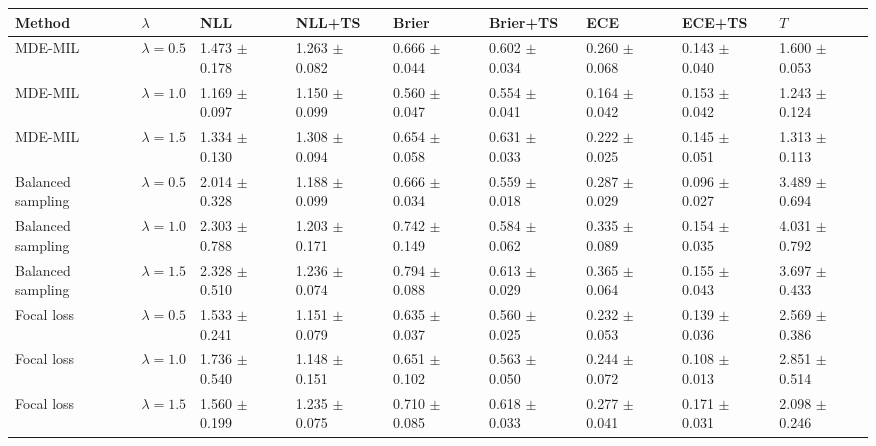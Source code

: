 \begin{tabular}{lllllllll}
\toprule
Method & $\lambda$ & NLL & NLL+TS & Brier & Brier+TS & ECE & ECE+TS & $T$\\
\midrule
MDE-MIL & $\lambda=0.5$ & \num{1.473} $\pm$ \num{0.178} & \num{1.263} $\pm$ \num{0.082} & \num{0.666} $\pm$ \num{0.044} & \num{0.602} $\pm$ \num{0.034} & \num{0.260} $\pm$ \num{0.068} & \num{0.143} $\pm$ \num{0.040} & \num{1.600} $\pm$ \num{0.053}\\
MDE-MIL & $\lambda=1.0$ & \num{1.169} $\pm$ \num{0.097} & \num{1.150} $\pm$ \num{0.099} & \num{0.560} $\pm$ \num{0.047} & \num{0.554} $\pm$ \num{0.041} & \num{0.164} $\pm$ \num{0.042} & \num{0.153} $\pm$ \num{0.042} & \num{1.243} $\pm$ \num{0.124}\\
MDE-MIL & $\lambda=1.5$ & \num{1.334} $\pm$ \num{0.130} & \num{1.308} $\pm$ \num{0.094} & \num{0.654} $\pm$ \num{0.058} & \num{0.631} $\pm$ \num{0.033} & \num{0.222} $\pm$ \num{0.025} & \num{0.145} $\pm$ \num{0.051} & \num{1.313} $\pm$ \num{0.113}\\
Balanced sampling & $\lambda=0.5$ & \num{2.014} $\pm$ \num{0.328} & \num{1.188} $\pm$ \num{0.099} & \num{0.666} $\pm$ \num{0.034} & \num{0.559} $\pm$ \num{0.018} & \num{0.287} $\pm$ \num{0.029} & \num{0.096} $\pm$ \num{0.027} & \num{3.489} $\pm$ \num{0.694}\\
Balanced sampling & $\lambda=1.0$ & \num{2.303} $\pm$ \num{0.788} & \num{1.203} $\pm$ \num{0.171} & \num{0.742} $\pm$ \num{0.149} & \num{0.584} $\pm$ \num{0.062} & \num{0.335} $\pm$ \num{0.089} & \num{0.154} $\pm$ \num{0.035} & \num{4.031} $\pm$ \num{0.792}\\
Balanced sampling & $\lambda=1.5$ & \num{2.328} $\pm$ \num{0.510} & \num{1.236} $\pm$ \num{0.074} & \num{0.794} $\pm$ \num{0.088} & \num{0.613} $\pm$ \num{0.029} & \num{0.365} $\pm$ \num{0.064} & \num{0.155} $\pm$ \num{0.043} & \num{3.697} $\pm$ \num{0.433}\\
Focal loss & $\lambda=0.5$ & \num{1.533} $\pm$ \num{0.241} & \num{1.151} $\pm$ \num{0.079} & \num{0.635} $\pm$ \num{0.037} & \num{0.560} $\pm$ \num{0.025} & \num{0.232} $\pm$ \num{0.053} & \num{0.139} $\pm$ \num{0.036} & \num{2.569} $\pm$ \num{0.386}\\
Focal loss & $\lambda=1.0$ & \num{1.736} $\pm$ \num{0.540} & \num{1.148} $\pm$ \num{0.151} & \num{0.651} $\pm$ \num{0.102} & \num{0.563} $\pm$ \num{0.050} & \num{0.244} $\pm$ \num{0.072} & \num{0.108} $\pm$ \num{0.013} & \num{2.851} $\pm$ \num{0.514}\\
Focal loss & $\lambda=1.5$ & \num{1.560} $\pm$ \num{0.199} & \num{1.235} $\pm$ \num{0.075} & \num{0.710} $\pm$ \num{0.085} & \num{0.618} $\pm$ \num{0.033} & \num{0.277} $\pm$ \num{0.041} & \num{0.171} $\pm$ \num{0.031} & \num{2.098} $\pm$ \num{0.246}\\

\end{tabular}

